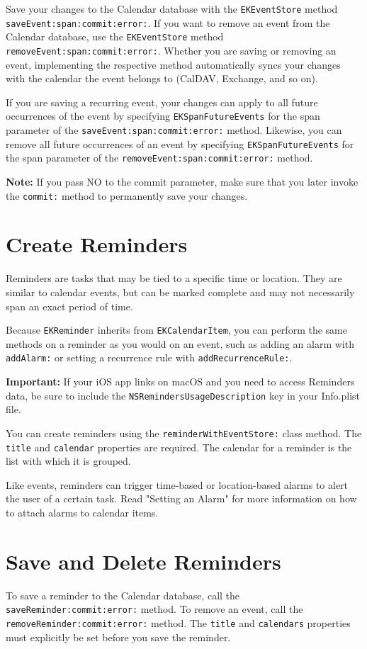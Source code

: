 \documentclass{article}
\begin{document}
Save your changes to the Calendar database with the \texttt{EKEventStore} method \texttt{saveEvent:span:commit:error:}. If you want to remove an event from the Calendar database, use the \texttt{EKEventStore} method \texttt{removeEvent:span:commit:error:}. Whether you are saving or removing an event, implementing the respective method automatically syncs your changes with the calendar the event belongs to (CalDAV, Exchange, and so on).

If you are saving a recurring event, your changes can apply to all future occurrences of the event by specifying \texttt{EKSpanFutureEvents} for the span parameter of the \texttt{saveEvent:span:commit:error:} method. Likewise, you can remove all future occurrences of an event by specifying \texttt{EKSpanFutureEvents} for the span parameter of the \texttt{removeEvent:span:commit:error:} method.

\textbf{Note:} If you pass NO to the commit parameter, make sure that you later invoke the \texttt{commit:} method to permanently save your changes.

\section*{Create Reminders}
Reminders are tasks that may be tied to a specific time or location. They are similar to calendar events, but can be marked complete and may not necessarily span an exact period of time.

Because \texttt{EKReminder} inherits from \texttt{EKCalendarItem}, you can perform the same methods on a reminder as you would on an event, such as adding an alarm with \texttt{addAlarm:} or setting a recurrence rule with \texttt{addRecurrenceRule:}.

\textbf{Important:} If your iOS app links on macOS and you need to access Reminders data, be sure to include the \texttt{NSRemindersUsageDescription} key in your Info.plist file.

You can create reminders using the \texttt{reminderWithEventStore:} class method. The \texttt{title} and \texttt{calendar} properties are required. The calendar for a reminder is the list with which it is grouped.

Like events, reminders can trigger time-based or location-based alarms to alert the user of a certain task. Read "Setting an Alarm" for more information on how to attach alarms to calendar items.

\section*{Save and Delete Reminders}
To save a reminder to the Calendar database, call the \texttt{saveReminder:commit:error:} method. To remove an event, call the \texttt{removeReminder:commit:error:} method. The \texttt{title} and \texttt{calendars} properties must explicitly be set before you save the reminder.
\end{document}
